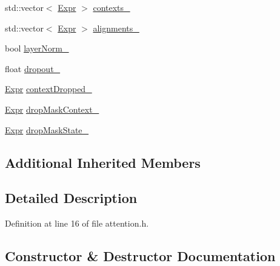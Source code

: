 \begin{DoxyCompactItemize}
\item 
std\+::vector$<$ \hyperlink{namespacemarian_a498d8baf75b754011078b890b39c8e12}{Expr} $>$ \hyperlink{classmarian_1_1rnn_1_1GlobalAttention_ad5499538c0b64f796c0b815f6a8654e5}{contexts\+\_\+}
\item 
std\+::vector$<$ \hyperlink{namespacemarian_a498d8baf75b754011078b890b39c8e12}{Expr} $>$ \hyperlink{classmarian_1_1rnn_1_1GlobalAttention_ad1d83af6ac1cf4c054fc38451cf49e46}{alignments\+\_\+}
\item 
bool \hyperlink{classmarian_1_1rnn_1_1GlobalAttention_a30abb68765a3b8d6a1b88f471b9f3c6b}{layer\+Norm\+\_\+}
\item 
float \hyperlink{classmarian_1_1rnn_1_1GlobalAttention_a54448ebcd15a874630f8988e99c77919}{dropout\+\_\+}
\item 
\hyperlink{namespacemarian_a498d8baf75b754011078b890b39c8e12}{Expr} \hyperlink{classmarian_1_1rnn_1_1GlobalAttention_af2d8e79f08edb6846b5e645928ddf60d}{context\+Dropped\+\_\+}
\item 
\hyperlink{namespacemarian_a498d8baf75b754011078b890b39c8e12}{Expr} \hyperlink{classmarian_1_1rnn_1_1GlobalAttention_aeebe2fffa0a2305bef2a26ff292201f4}{drop\+Mask\+Context\+\_\+}
\item 
\hyperlink{namespacemarian_a498d8baf75b754011078b890b39c8e12}{Expr} \hyperlink{classmarian_1_1rnn_1_1GlobalAttention_a0278e2cbabd73c51991d391e8d736aac}{drop\+Mask\+State\+\_\+}
\end{DoxyCompactItemize}
\subsection*{Additional Inherited Members}


\subsection{Detailed Description}


Definition at line 16 of file attention.\+h.



\subsection{Constructor \& Destructor Documentation}
